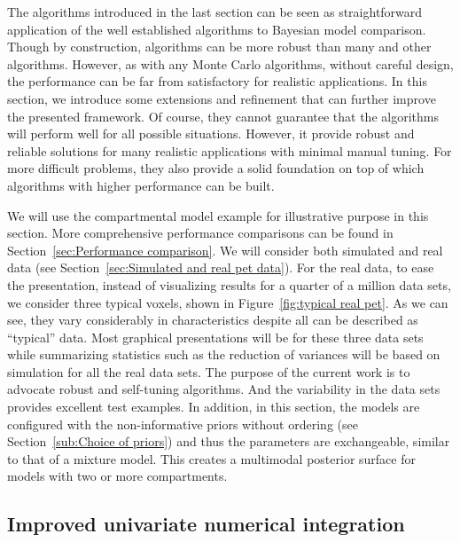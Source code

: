 The algorithms introduced in the last section can be seen as straightforward application of the well established \smc algorithms to Bayesian model comparison. Though by construction, \smc algorithms can be more robust than many \mcmc and other algorithms. However, as with any Monte Carlo algorithms, without careful design, the performance can be far from satisfactory for realistic applications. In this section, we introduce some extensions and refinement that can further improve the presented framework. Of course, they cannot guarantee that the algorithms will perform well for all possible situations. However, it provide robust and reliable solutions for many realistic applications with minimal manual tuning. For more difficult problems, they also provide a solid foundation on top of which algorithms with higher performance can be built.

We will use the \pet compartmental model example for illustrative purpose in this section. More comprehensive performance comparisons can be found in Section~\ref{sec:Performance comparison}. We will consider both simulated and real data (see Section~\ref{sec:Simulated and real pet data}). For the real data, to ease the presentation, instead of visualizing results for a quarter of a million data sets, we consider three typical voxels, shown in Figure~\ref{fig:typical real pet}. As we can see, they vary considerably in characteristics despite all can be described as ``typical'' \pet data. Most graphical presentations will be for these three data sets while summarizing statistics such as the reduction of variances will be based on simulation for all the real data sets. The purpose of the current work is to advocate robust and self-tuning algorithms. And the variability in the data sets provides excellent test examples. In addition, in this section, the models are configured with the non-informative priors without ordering (see Section~\ref{sub:Choice of priors}) and thus the parameters are exchangeable, similar to that of a mixture model. This creates a multimodal posterior surface for models with two or more compartments.



\subsection{Improved univariate numerical integration}
\label{sub:Improved univariate numerical integration}

